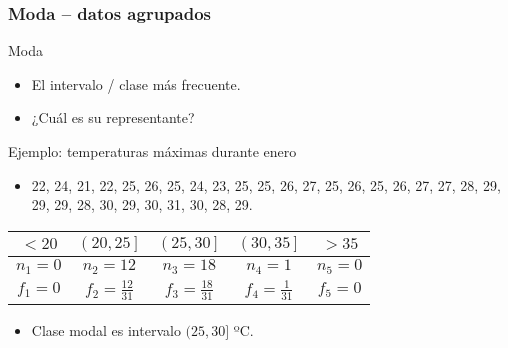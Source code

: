 \documentclass[table]{beamer}
\begin{document}
\begin{frame}
    \frametitle{Moda -- datos agrupados}
    \begin{block}{Moda}
        \begin{itemize}
            \item El intervalo / clase más frecuente.
            \item ¿Cuál es su representante?
        \end{itemize}
    \end{block}
    \begin{exampleblock}{Ejemplo: temperaturas máximas durante enero}
        \begin{itemize}
            \item 22, 24, 21, 22, 25, 26, 25, 24, 23, 25, 25, 26, 27, 25, 26, 25, 26, 27, 27, 28, 29, 29, 29, 28, 30, 29, 30, 31, 30, 28, 29.
        \end{itemize}
        \begin{center}
            \begin{tabular}{c|c|c|c|c}
                $< 20$ & $\left ( 20 , 25 \right ]$ & $\left ( 25 , 30 \right ]$ & $\left ( 30 , 35 \right ]$ & $> 35$ \\
                \hline
                $n_{1} = 0$ & $n_{2} = 12$ & $n_{3} = 18$ & $n_{4} = 1$ & $n_{5} = 0$ \\
                \hline
                $f_{1} = 0$ & $f_{2} = \frac{12}{31}$ & $f_{3} = \frac{18}{31}$ & $f_{4} = \frac{1}{31}$ & $f_{5} = 0$ \\
            \end{tabular}
        \end{center}
        \begin{itemize}
            \item Clase modal es intervalo $( 25 , 30 ]$ ºC.
        \end{itemize}
    \end{exampleblock}
\end{frame}
\end{document}
